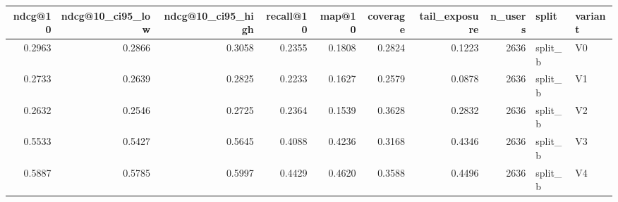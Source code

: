 \begin{tabular}{rrrrrrrrll}
\toprule
ndcg@10 & ndcg@10_ci95_low & ndcg@10_ci95_high & recall@10 & map@10 & coverage & tail_exposure & n_users & split & variant \\
\midrule
0.2963 & 0.2866 & 0.3058 & 0.2355 & 0.1808 & 0.2824 & 0.1223 & 2636 & split_b & V0 \\
0.2733 & 0.2639 & 0.2825 & 0.2233 & 0.1627 & 0.2579 & 0.0878 & 2636 & split_b & V1 \\
0.2632 & 0.2546 & 0.2725 & 0.2364 & 0.1539 & 0.3628 & 0.2832 & 2636 & split_b & V2 \\
0.5533 & 0.5427 & 0.5645 & 0.4088 & 0.4236 & 0.3168 & 0.4346 & 2636 & split_b & V3 \\
0.5887 & 0.5785 & 0.5997 & 0.4429 & 0.4620 & 0.3588 & 0.4496 & 2636 & split_b & V4 \\
\bottomrule
\end{tabular}

